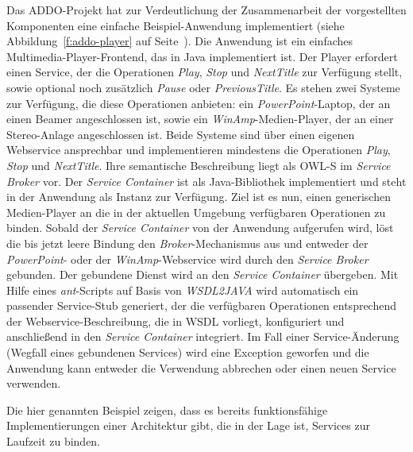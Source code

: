 Das \ac{ADDO}-Projekt hat zur Verdeutlichung der Zusammenarbeit der vorgestellten Komponenten eine einfache Beispiel-Anwendung implementiert (siehe Abbildung~\ref{f:addo-player} auf Seite~\pageref{f:addo-player}). Die Anwendung ist ein einfaches Multimedia-Player-Frontend, das in Java implementiert ist. Der Player erfordert einen Service, der die Operationen \emph{Play}, \emph{Stop} und \emph{NextTitle} zur Verfügung stellt, sowie optional noch zusätzlich \emph{Pause} oder \emph{PreviousTitle}. Es stehen zwei Systeme zur Verfügung, die diese Operationen anbieten: ein \emph{PowerPoint}-Laptop, der an einen Beamer angeschlossen ist, sowie ein \emph{WinAmp}-Medien-Player, der an einer Stereo-Anlage angeschlossen ist. Beide Systeme sind über einen eigenen Webservice ansprechbar und implementieren mindestens die Operationen \emph{Play}, \emph{Stop} und \emph{NextTitle}. Ihre semantische Beschreibung liegt als \ac{OWL-S} im \emph{Service Broker} vor. Der \emph{Service Container} ist als Java-Bibliothek implementiert und steht in der Anwendung als Instanz zur Verfügung. Ziel ist es nun, einen generischen Medien-Player an die in der aktuellen Umgebung verfügbaren Operationen zu binden. Sobald der \emph{Service Container} von der Anwendung aufgerufen wird, löst die bis jetzt leere Bindung den \emph{Broker}-Mechanismus aus und entweder der \emph{PowerPoint}- oder der \emph{WinAmp}-Webservice wird durch den \emph{Service Broker} gebunden. Der gebundene Dienst wird an den \emph{Service Container} übergeben. Mit Hilfe eines \emph{ant}-Scripts auf Basis von \emph{WSDL2JAVA} wird automatisch ein passender Service-Stub generiert, der die verfügbaren Operationen entsprechend der Webservice-Beschreibung, die in \ac{WSDL} vorliegt, konfiguriert und anschließend in den \emph{Service Container} integriert. Im Fall einer Service-Änderung (Wegfall eines gebundenen Services) wird eine Exception geworfen und die Anwendung kann entweder die Verwendung abbrechen oder einen neuen Service verwenden.

\bigskip

Die hier genannten Beispiel zeigen, dass es bereits funktionsfähige Implementierungen einer Architektur gibt, die in der Lage ist, Services zur Laufzeit zu binden.